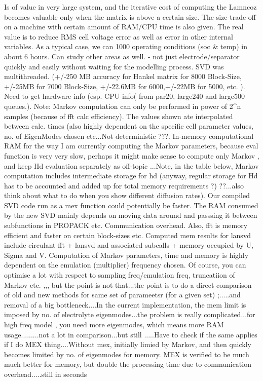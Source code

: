 Is of value in very large system, and the iterative cost of computing
the Lamncoz becomes valuable only when the matrix is above a certain
size. The size-trade-off on a machine with certain amount of RAM/CPU
time is also given. The real value is to reduce RMS cell voltage error
as well as error in other internal variables. As a typical case, we
can 1000 operating conditions (soc \& temp) in about 6 hours. Can
study other areas as well. - not just electrode/separator quickly
and easily without waiting for the modelling process. SVD was multithreaded.
(+/-250 MB accuracy for Hankel matrix for 8000 Block-Size, +/-25MB
for 7000 Block-Size, +/-22.6MB for 6000,+/-22MB for 5000, etc. ).
Need to get hardware info (esp. CPU info( from par20, large240 and
large500 queues.). Note: Markov computation can only be performed
in power of 2\textasciicircum n samples (because of fft calc efficiency).
The values shown ate interpolated between calc. times (also highly
dependent on the specific cell parameter values, no. of EigenModes
chosen etc...Not deterministic ???. In-memory computational RAM for
the way I am currently computing the Markov parameters, because eval
function is very very slow, perhaps it might make sense to compute
only Markov , and keep Hd evaluation separately as off-topic ...Note,
in the table below, Markov computation includes intermediate storage
for hd (anyway, regular storage for Hd has to be accounted and added
up for total memory requirements ?) ??...also think about what to
do when you show different diffusion rates). Our compiled SVD code
run as a mex function could potentially be faster. The RAM consumed
by the new SVD mainly depends on moving data around and passsing it
between subfunctions in PROPACK etc. Communication overhead. Also,
fft is memory efficient and faster on certain block-sizes etc. Computed
mem results for lansvd include circulant fft + lansvd and associated
subcalls + memory occupied by U, Sigma and V. Computation of Markov
parameters, time and memory is highly dependent on the emulation (multiplier)
frequency chosen. Of course, you can optimise a lot with respect to
sampling freq/emulation freq, truncatiion of Markov etc. ,,, but the
point is not that...the point is to do a direct comparison of old
and new methods for same set of parameetsr (for a given set) ;.....and
removal of a big bottleneck....In the current implementation, the
mem limit is imposed by no. of electrolyte eigenmodes...the problem
is really complicated...for high freq model , you need more eigenmodes,
which means more RAM usage.........not a lot in comparison...but still
.....Have to check if the same applies if I do MEX thing....Without
mex, initially limied by Markov, and then quickly becomes limited
by no. of eigenmodes for memory. MEX is verified to be much much better
for memory, but double the processing time due to communication overhead.....still
in seconds


